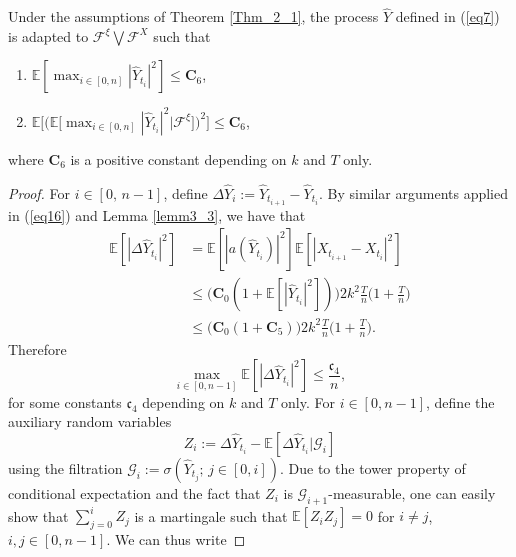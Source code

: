 \begin{lemma}\label{lemma34}
Under the assumptions of Theorem \ref{Thm_2_1}, the process $\hat{Y}$ defined in (\ref{eq7}) is adapted to $\mathcal{F}^{\xi} \bigvee \mathcal{F}^{X}$ such that 
\begin{enumerate}[label=(\roman*)]
    \item $\mathbb{E}[\max_{i \in [0, n]}|\hat{Y}_{t_i}|^2] \leq \mathbf{C}_6 $, \label{lemma34_1}
    \item $\mathbb{E} \bigg[ \big( \mathbb{E} \big[\max_{i \in [0, n]}|\hat{Y}_{t_i}|^2|\mathcal{F}^{\xi} \big] \big)^2 \bigg] \leq \mathbf{C}_6$, \label{lemma34_2}
\end{enumerate}
where $\mathbf{C}_6$ is a positive constant depending on $k$ and $T$ only.
\end{lemma}
\begin{proof}
For $i \in [0, \, n-1]$, define $\Delta \hat{Y}_i := \hat{Y}_{t_{i+1}} - \hat{Y}_{t_{i}}$. By similar arguments applied in (\ref{eq16}) and Lemma \ref{lemm3_3}, we have that
\begin{equation*}
    \begin{split}
        \mathbb{E}[|\Delta \hat{Y}_{t_{i}}|^2] &= \mathbb{E}[|a(\hat{Y}_{t_{i}})|^2]\mathbb{E}[|X_{t_{i+1}} - X_{t_{i}}|^2]\\
        &\leq  \big(\mathbf{C}_0 (1 + \mathbb{E}[|\hat{Y}_{t_{i}}|^2]) \big)2k^2 \frac{T}{n} \bigg(1 + \frac{T}{n} \bigg)\\
        &\leq \big(\mathbf{C}_0 (1 + \mathbf{C}_5) \big)2k^2 \frac{T}{n} \bigg(1 + \frac{T}{n} \bigg).
    \end{split}
\end{equation*}
Therefore
\begin{equation}\label{eq_17}
     \max_{i \in [0, n-1]}\mathbb{E}[|\Delta \hat{Y}_{t_{i}}|^2] \leq \frac{\mathfrak{c}_4}{n},
\end{equation}
for some constants $\mathfrak{c}_4$ depending on $k$ and $T$ only. For $i \in [0, n-1]$, define the  auxiliary random variables 
\begin{equation}
    Z_i := \Delta \hat{Y}_{t_{i}} -  \mathbb{E}[\Delta \hat{Y}_{t_{i}}|\mathcal{G}_{i}]
\end{equation}
using the filtration $\mathcal{G}_{i} := \sigma( \hat{Y}_{t_{j}} ; \,  j \in [0, i])$. Due to the tower property of conditional expectation and the fact that $Z_i$ is $\mathcal{G}_{i+1}$-measurable, one can easily show that $\sum_{j=0}^i Z_j$ is a martingale such that $\mathbb{E}[Z_i Z_j] = 0$ for $i \neq j$, $i, j \in [0, n-1]$. We can thus write

\end{proof}
